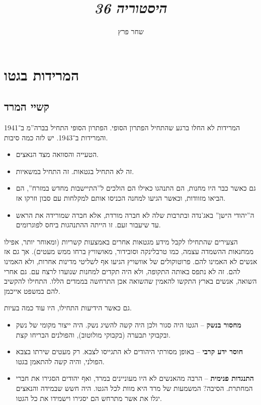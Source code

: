 \documentclass[]{article}
\author{שחר פרץ}
\title{\textit{היסטוריה 36}}
\begin{document}
	\maketitle
	
	\section{המרידות בגטו}
	
	\subsection*{קשיי המרד}
	המרידות לא החלו ברגע שהתחיל הפתרון הסופי. הפתרון הסופי התחיל בברה''מ ב־1941 והמרידות ב־1943. יש לזה כמה סיבות. 
	\begin{itemize}
		\item הטעייה והסוואה מצד הנאצים. 
		\item זה לא התחיל בגטאות. זה התחיל במשאיות. 
		\item גם כאשר כבר היו מחנות, הם התנהגו כאילו הם הולכים ל''התיישבות מחדש במזרח'', הם הביאו מזוודות, וכאשר הגיעו למחנה הכניסו אותם למקלחות עם סבון וזרקו אז. 
		\item ה''יהודי הישן'' באג'נדה ובתרבות שלה לא חברה מורדת, אלא חברה שמורידה את הראש עד שיעבור זעם. זו הייתה ההתנהגות ביחס לפוגרומים. 
	\end{itemize}
	הצעירים שהתחילו לקבל מידע מגטאות אחרים באמצעות קשריות (ומאוחר יותר, אפילו ממחנאות ההשמדה עצמה, כמו טרבלינקה וסובידור, מאושוויץ ברחו ממש מעטים). אך גם אז אנשים לא האמינו להם. פרוטוקולים של אוושויץ הגיעו אף לשליטי מדינות אחרות, ולא האמינו להם. זה לא נתפס באותה התקופה, ולא היה תקדים למחנות שנועדו לרצח עם. גם אחרי השואה, אנשים בארץ התקשו להאמין שהשואה אכן התרחשה בממדים הללו. התחילו להקשיב להם במשפט אייכמן. 
	
	גם כאשר הידיעות התחילו, היו עוד כמה בעיות. 
	\begin{itemize}
		\item \textbf{מחסור בנשק} – הגטו היה סגור ולכן היה קשה להשיג נשק. היה ייצור מקומי של נשק ובקבוקי תבערה (בקבוקי מולוטוב), והפולנים הבריחו קצת. 
		\item \textbf{חוסר ידע קרבי} – באופן מסורתי היהודים לא התגייסו לצבא. רק מעטים שירתו בצבא הפולני, והיה קשה להתאמן בגטו. 
		\item \textbf{התנגדות פנימית} – הרבה מהאנשים לא היו מעוניינים במרד, ואף יהודים הסגירו את חברי המחתרת. הסיבה? המשמעות של מרד היא מוות לכל הגטו. היה חשש שבמידה והנאצים יגלו את אשר מתרחש הם יסגירו וישמידו את כל הגטו. 
	\end{itemize}
	
\end{document}
